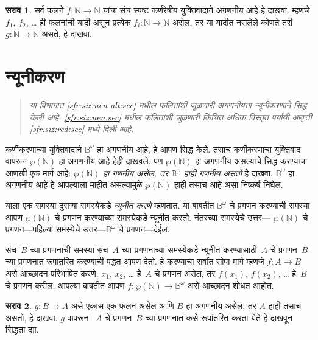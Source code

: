 \documentclass[11pt,a4paper,openany]{book}
\theoremstyle{definition}
\newtheorem{prob}{सराव}[chapter]
\newcommand{\Pow}[1]{\wp(#1)}
\newcommand{\Nat}{\mathbb{N}}
\newcommand{\Bin}{\mathbb{B}}
\newenvironment{editorial}{\begin{quote}\small\itshape}{\end{quote}}
\begin{document}
\begin{prob}
सर्व फलने $f \colon \Nat \to \Nat$ यांचा संच स्पष्ट कर्णरेषीय
युक्तिवादाने अगणनीय आहे हे दाखवा. म्हणजे $f_1$, $f_2$,
\dots{} ही फलनांची यादी असून प्रत्येक $f_i\colon \Nat \to \Nat$
असेल, तर या यादीत नसलेले कोणते तरी $g \colon \Nat \to \Nat$ असते,
हे दाखवा.
\end{prob}









\section{न्यूनीकरण}\label{sfr:siz:red-alt:sec}

\begin{editorial}
  या विभागात \ref{sfr:siz:nen-alt:sec} मधील फलितांशी जुळणारी अगणनीयता
  न्यूनीकरणाने सिद्ध केली आहे. \ref{sfr:siz:nen:sec} मधील फलितांशी जुळणारी
  किंचित अधिक विस्तृत पर्यायी आवृत्ती \ref{sfr:siz:red:sec} मध्ये दिली आहे.
\end{editorial}

कर्णीकरणाच्या युक्तिवादाने $\Bin^\omega$ हा अगणनीय आहे,
हे आपण सिद्ध केले. तसाच कर्णीकरणाचा युक्तिवाद वापरून $\Pow{\Nat}$ हा
अगणनीय आहे हेही दाखवले. पण $\Pow{\Nat}$ हा
अगणनीय असल्याचे सिद्ध करण्याचा आणखी एक मार्ग आहे:
\emph{$\Pow{\Nat}$ हा गणनीय असेल, तर $\Bin^\omega$ हाही
गणनीय असतो} हे दाखवा. $\Bin^\omega$ हा अगणनीय
आहे हे आपल्याला माहीत असल्यामुळे $\Pow{\Nat}$ हाही तसाच आहे असा
निष्कर्ष निघेल.

याला एक समस्या दुसऱ्या समस्येकडे \emph{न्यूनीत करणे} म्हणतात. या
बाबतीत $\Bin^\omega$ चे प्रगणन करण्याची समस्या आपण $\Pow{\Nat}$ चे
प्रगणन करण्याच्या समस्येकडे न्यूनीत करतो. नंतरच्या समस्येचे उत्तर---
$\Pow{\Nat}$ चे प्रगणन---पहिल्या समस्येचे उत्तर---$\Bin^\omega$ चे
प्रगणन---देईल.

संच~$B$ च्या प्रगणनाची समस्या संच~$A$ च्या प्रगणनाच्या समस्येकडे
न्यूनीत करण्यासाठी~$A$ चे प्रगणन~$B$ च्या प्रगणनात रूपांतरित करण्याची
पद्धत आपण देतो. हे करण्याचा सर्वांत सोपा मार्ग म्हणजे
$f\colon A \to B$ असे आच्छादन परिभाषित करणे. $x_1$, $x_2$,
\dots{} हे~$A$ चे प्रगणन असेल, तर $f(x_1)$, $f(x_2)$, \dots{} हे~$B$
चे प्रगणन करील. आपल्या बाबतीत आपण
$f\colon \Pow{\Nat} \to \Bin^\omega$ असे आच्छादन शोधत आहोत.

\begin{prob}
$g\colon B \to A$ असे एकास-एक फलन असेल आणि $B$ हा
अगणनीय असेल, तर $A$ हाही तसाच असतो, हे दाखवा. $g$ वापरून
~$A$ चे प्रगणन~$B$ च्या प्रगणनात कसे रूपांतरित करता येते हे दाखवून
सिद्धता द्या.
\end{prob}
\end{document}
